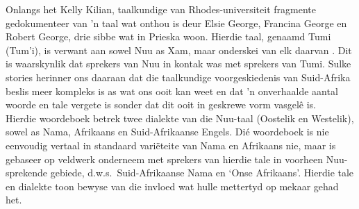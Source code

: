 Onlangs het Kelly Kilian, taalkundige van Rhodes-universiteit
fragmente gedokumenteer van 'n taal wat onthou is deur Elsie George,
Francina George en Robert George, drie sibbe wat in Prieska woon.
Hierdie taal, genaamd Tumi (Tum'i), is verwant aan sowel
N\textipa{\textvertline}uu as \textipa{\textvertline}Xam, maar
onderskei van elk daarvan \parencite{Kilian2020}. Dit is waarskynlik
dat sprekers van N\textipa{\textvertline}uu in kontak was met sprekers
van Tumi. Sulke stories herinner ons daaraan dat die
taalkundige voorgeskiedenis van Suid-Afrika beslis meer kompleks is as
wat ons ooit kan weet en dat 'n onverhaalde aantal woorde en tale
vergete is sonder dat dit ooit in geskrewe vorm vasgel\^{e} is.\\

Hierdie woordeboek betrek twee dialekte van die
N\textipa{\textvertline}uu-taal (Oostelik en Westelik), sowel as Nama,
Afrikaans en Suid-Afrikaanse Engels. Di\'{e} woordeboek is nie
eenvoudig vertaal in standaard vari\"{e}teite van Nama en Afrikaans
nie, maar is gebaseer op veldwerk onderneem met sprekers van hierdie
tale in voorheen N\textipa{\textvertline}uu-sprekende gebiede, d.w.s.\
Suid-Afrikaanse Nama en `Onse Afrikaans'. Hierdie tale en dialekte
toon bewyse van die invloed wat hulle mettertyd op mekaar gehad het.\\

